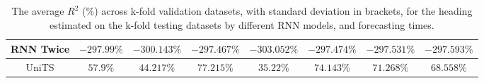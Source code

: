 \begin{table}[!ht]
{\begin{tabular}{|c|c|c|c|c|c|c|c|}
			RNN Twice & $-297.99\%$ & $-300.143\%$ & $-297.467\%$ & $-303.052\%$ & $-297.474\%$ & $-297.531\%$ & $-297.593\%$ \\ \hline
			UniTS & $\mathbf{57.9\%}$ & $\mathbf{44.217\%}$ & $77.215\%$ & $\mathbf{35.22\%}$ & $74.143\%$ & $71.268\%$ & $\mathbf{68.558\%}$ \\ \hline
		\end{tabular}
	}
	\caption{The average $R^{2}$ (\%) across k-fold validation datasets, with standard deviation in brackets, for the heading estimated on the k-fold testing datasets by different RNN models, and forecasting times.}
	\label{tab:all_direction_R2}
\end{table}